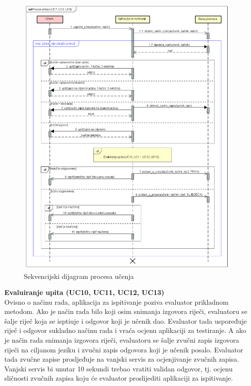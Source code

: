 				\begin{figure}[H]
					\includegraphics[width=\textwidth]{dijagrami/SD_ProcesUcenja.png} %
					\caption{Sekvencijski dijagram procesa učenja}
					\label{fig:SD_ProcesUcenja} %
				\end{figure}
				
				\textbf{Evaluiranje upita (UC10, UC11, UC12, UC13)}\\
				
				{Ovisno o načinu rada, aplikacija za ispitivanje poziva evaluator prikladnom metodom. Ako je način rada bilo koji osim snimanja izgovora riječi, evaluatoru se šalje riječ koja se isptiuje i odgovor koji je učenik dao. Evaluator tada uspoređuje riječ i odgovor sukladno načinu rada i vraća ocjenu aplikaciji za testiranje. A ako je način rada snimanja izgovora riječi, evaluatoru se šalje zvučni zapis izgovora riječi na ciljanom jeziku i zvučni zapis odgovora koji je učenik posalo. Evaluator tada zvučne zapise prosljeđuje na vanjski servis za ocjenjivanje zvučnih zapisa. Vanjski servis bi unutar 10 sekundi trebao vratiti validan odgovor, tj. ocjenu sličnosti zvučnih zapisa koju će evaluator proslijediti aplikaciji za ispitivanje.}
				\eject
				
